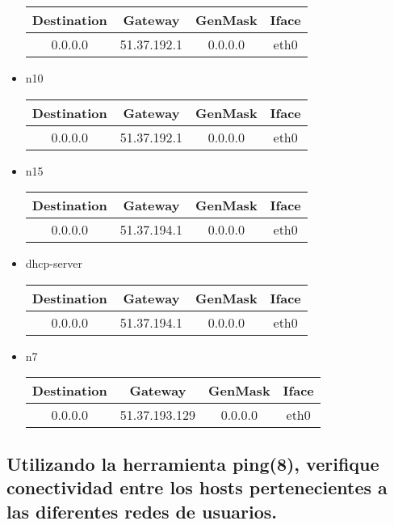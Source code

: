 \documentclass[11pt]{article} %
\begin{document}
\begin{itemize}
            \begin{tabular}{ |c|c|c|c| } 
            \hline
                Destination & Gateway & GenMask & Iface \\
            \hline
                0.0.0.0 & 51.37.192.1 & 0.0.0.0 & eth0 \\
            \hline
            \end{tabular}
            \item n10

            \begin{tabular}{ |c|c|c|c| } 
            \hline
                Destination & Gateway & GenMask & Iface \\
            \hline
                0.0.0.0 & 51.37.192.1 & 0.0.0.0 & eth0 \\
            \hline
            \end{tabular}
            \item n15

            \begin{tabular}{ |c|c|c|c| } 
            \hline
                Destination & Gateway & GenMask & Iface \\
            \hline
                0.0.0.0 & 51.37.194.1 & 0.0.0.0 & eth0 \\
            \hline
            \end{tabular}
            \item dhcp-server

            \begin{tabular}{ |c|c|c|c| } 
            \hline
                Destination & Gateway & GenMask & Iface \\
            \hline
                0.0.0.0 & 51.37.194.1 & 0.0.0.0 & eth0 \\
            \hline
            \end{tabular}
            \item n7

            \begin{tabular}{ |c|c|c|c| } 
            \hline
                Destination & Gateway & GenMask & Iface \\
            \hline
                0.0.0.0 & 51.37.193.129 & 0.0.0.0 & eth0 \\
            \hline
            \end{tabular}
        \end{itemize}

        \subsection{Utilizando la herramienta ping(8), verifique conectividad entre los hosts pertenecientes a las diferentes redes de usuarios.}
\end{document}
